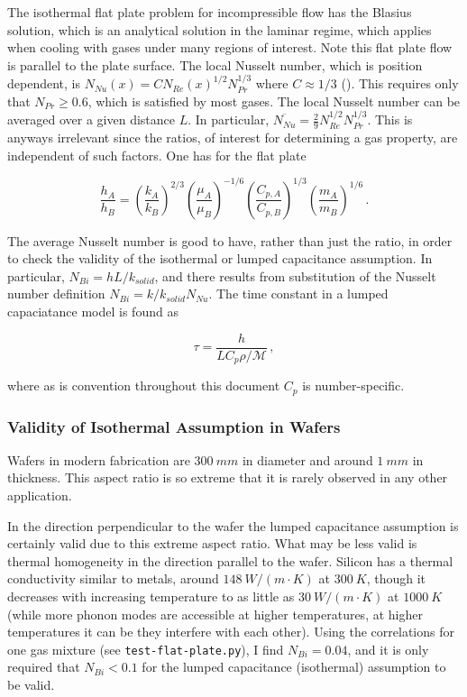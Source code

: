 \documentclass{article}
\begin{document}
The isothermal flat plate problem for incompressible flow has the Blasius
solution, which is an analytical solution in the laminar regime, which applies
when cooling with gases under many regions of interest.  Note this flat plate
flow is parallel to the plate surface. The local Nusselt number, which is
position dependent, is $N_{Nu}(x) = C N_{Re}(x)^{1/2} N_{Pr}^{1/3}$ where $C
\approx 1/3$ (\cite[eqn.~7.30]{incropera1996fundamentals}). This requires only
that $N_{Pr} \geq 0.6$, which is satisfied by most gases. The local Nusselt
number can be averaged over a given distance $L$. In particular,
$\overline{N_{Nu}} = \frac 29 N_{Re}^{1/2} N_{Pr}^{1/3}$. This is anyways
irrelevant since the ratios, of interest for determining a gas property, are
independent of such factors. One has for the flat plate

\begin{equation} 
\frac{h_A}{h_B} = \left(\frac{k_A}{k_B}\right)^{2/3} 
\left(\frac{\mu_A}{\mu_B}\right)^{-1/6} 
\left(\frac{C_{p, A}}{C_{p, B}}\right)^{1/3} 
\left(\frac{m_A}{m_B}\right)^{1/6} \,.
\end{equation} %

The average Nusselt number is good to have, rather than
just the ratio, in order to check the validity of the isothermal or lumped
capacitance assumption. In particular, $N_{Bi} = hL/k_{solid}$, and there
results from substitution of the Nusselt number definition $N_{Bi} =
k/k_{solid} N_{Nu}$. The time constant in a lumped capaciatance model is found as 

$$\tau = \frac{h}{L C_p \rho/\mathcal{M}} \,,$$

where as is convention throughout this document $C_p$ is number-specific.

\subsubsection{Validity of Isothermal Assumption in Wafers}\label{sec:validity-isothermal}

Wafers in modern fabrication are $\SI{300}{mm}$ in diameter and around
$\SI{1}{mm}$ in thickness. This aspect ratio is so extreme that it is rarely
observed in any other application.

In the direction perpendicular to the wafer the lumped capacitance assumption
is certainly valid due to this extreme aspect ratio. What may be less valid is
thermal homogeneity in the direction parallel to the wafer. Silicon has a
thermal conductivity similar to metals, around $\SI{148}{W/(m\cdot K)}$ at
$\SI{300}{K}$, though it decreases with increasing temperature to as little as
$\SI{30}{W/(m\cdot K)}$ at $\SI{1000}{K}$ (while more phonon modes are
accessible at higher temperatures, at higher temperatures it can be they
interfere with each other). Using the correlations for one gas mixture (see 
\texttt{test-flat-plate.py}), I find $N_{Bi} = 0.04$, and it is only required that
$N_{Bi} < 0.1$ for the lumped capacitance (isothermal) assumption to be valid. 
\end{document}
